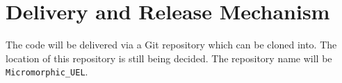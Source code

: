 \section{Delivery and Release Mechanism}

The code will be delivered via a Git repository which can be cloned into. The location of this repository is still being decided. The repository name will be \verb|Micromorphic_UEL|.